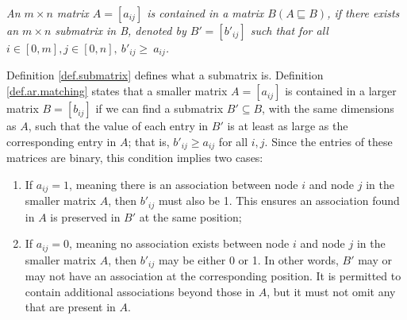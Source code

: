 \begin{definition}
	\label{def.ar.matching}
	\textit{
		An $m\times n$ matrix $A = [a_{ij}]$ is \emph{contained} in a matrix $B (A
		\sqsubseteq B)$, if there exists an $m\times n$ submatrix in B, denoted by $B' =
		[b'_{ij}]$ such that for all $i \in [0,m] ,j \in [0,n],\ b'_{ij}  \geq \ a_{ij}
		$.}
\end{definition}

Definition \ref{def.submatrix} defines what a submatrix is.  Definition
\ref{def.ar.matching}
states that a smaller matrix \( A = [a_{ij}] \) is contained in a larger matrix
\( B =
[b_{ij}] \) if we can find a submatrix \( B' \subseteq B \), with the same
dimensions as \( A \), such that the value of each entry in \( B' \) 
is at least as large as the corresponding entry in \( A \); that is, \(
b'_{ij} \geq a_{ij} \) for all \( i, j \). Since the entries of these matrices
are binary, this condition implies two cases:

\begin{enumerate}[label=(\alph*)]
	\item If \( a_{ij} = 1 \), meaning there is an association between node \(
	i \) and node \( j \) in the smaller matrix \( A \), then \( b'_{ij} \) must
	also be 1. This ensures an association found in \( A \) is preserved in \(B'\)
	at the same position;
	\item If \( a_{ij} = 0 \), meaning no association exists between node \( i \)
	and node \( j \) in the smaller matrix \( A \), then \( b'_{ij} \) may be
	either 0 or 1. In other words, \( B' \) may or may not have an
	association at the corresponding position. It is permitted to contain
	additional associations beyond those in \( A \), but it must not omit any that
	are present in \( A \).
\end{enumerate}

